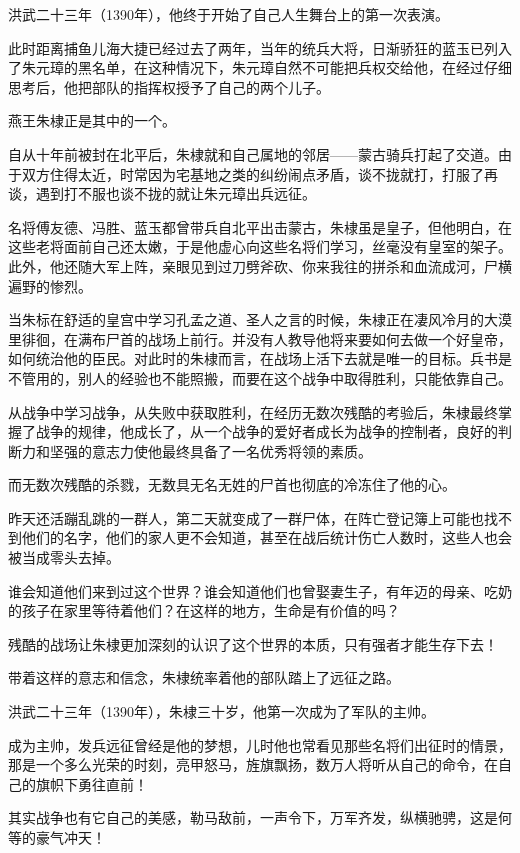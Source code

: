 \begin{multicols}{\theparacolNo}
		洪武二十三年（1390年），他终于开始了自己人生舞台上的第一次表演。

		此时距离捕鱼儿海大捷已经过去了两年，当年的统兵大将，日渐骄狂的蓝玉已列入了朱元璋的黑名单，在这种情况下，朱元璋自然不可能把兵权交给他，在经过仔细思考后，他把部队的指挥权授予了自己的两个儿子。

		燕王朱棣正是其中的一个。

		自从十年前被封在北平后，朱棣就和自己属地的邻居——蒙古骑兵打起了交道。由于双方住得太近，时常因为宅基地之类的纠纷闹点矛盾，谈不拢就打，打服了再谈，遇到打不服也谈不拢的就让朱元璋出兵远征。

		名将傅友德、冯胜、蓝玉都曾带兵自北平出击蒙古，朱棣虽是皇子，但他明白，在这些老将面前自己还太嫩，于是他虚心向这些名将们学习，丝毫没有皇室的架子。此外，他还随大军上阵，亲眼见到过刀劈斧砍、你来我往的拼杀和血流成河，尸横遍野的惨烈。

		当朱标在舒适的皇宫中学习孔孟之道、圣人之言的时候，朱棣正在凄风冷月的大漠里徘徊，在满布尸首的战场上前行。并没有人教导他将来要如何去做一个好皇帝，如何统治他的臣民。对此时的朱棣而言，在战场上活下去就是唯一的目标。兵书是不管用的，别人的经验也不能照搬，而要在这个战争中取得胜利，只能依靠自己。

		从战争中学习战争，从失败中获取胜利，在经历无数次残酷的考验后，朱棣最终掌握了战争的规律，他成长了，从一个战争的爱好者成长为战争的控制者，良好的判断力和坚强的意志力使他最终具备了一名优秀将领的素质。

		而无数次残酷的杀戮，无数具无名无姓的尸首也彻底的冷冻住了他的心。

		昨天还活蹦乱跳的一群人，第二天就变成了一群尸体，在阵亡登记簿上可能也找不到他们的名字，他们的家人更不会知道，甚至在战后统计伤亡人数时，这些人也会被当成零头去掉。

		谁会知道他们来到过这个世界？谁会知道他们也曾娶妻生子，有年迈的母亲、吃奶的孩子在家里等待着他们？在这样的地方，生命是有价值的吗？

		残酷的战场让朱棣更加深刻的认识了这个世界的本质，只有强者才能生存下去！

		带着这样的意志和信念，朱棣统率着他的部队踏上了远征之路。

		洪武二十三年（1390年），朱棣三十岁，他第一次成为了军队的主帅。

		成为主帅，发兵远征曾经是他的梦想，儿时他也常看见那些名将们出征时的情景，那是一个多么光荣的时刻，亮甲怒马，旌旗飘扬，数万人将听从自己的命令，在自己的旗帜下勇往直前！

		其实战争也有它自己的美感，勒马敌前，一声令下，万军齐发，纵横驰骋，这是何等的豪气冲天！


\end{multicols}
